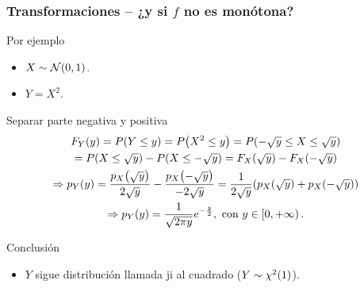 \documentclass[table]{beamer}
\begin{document}
\begin{frame}
    \frametitle{Transformaciones -- ¿y si $f$ no es monótona?}
    \begin{exampleblock}{Por ejemplo}
        \begin{itemize}
            \item $X \sim \normal{0}{1}$.
            \item $Y = X^{2}$.
        \end{itemize}
    \end{exampleblock}
    \begin{block}{Separar parte negativa y positiva}
        \begin{multline*}
            \pFF{Y}{y} = \prob{Y \leq y} = \prob{X^{2} \leq y}
            = \prob{- \sqrt{y} \leq X \leq \sqrt{y}}
            \\
            = \prob{X \leq \sqrt{y}} - \prob{X \leq - \sqrt{y}}
            = \pFF{X}{\sqrt{y}} - \pFF{X}{- \sqrt{y}}
            \\
            \Rightarrow
            \ppdf{Y}{y} =
            \frac{\ppdf{X}{\sqrt{y}}}{2 \sqrt{y}} - \frac{\ppdf{X}{- \sqrt{y}}}{- 2 \sqrt{y}}
            = \frac{1}{2 \sqrt{y}} \parens{\ppdf{X}{\sqrt{y}} + \ppdf{X}{- \sqrt{y}}}
            \\
            \Rightarrow
            \ppdf{Y}{y}
            = \frac{1}{\sqrt{2 \pi y}} e^{-\frac{y}{2}} ,
            \text{ con } y \in \left [ 0 , + \infty \right ) .
        \end{multline*}
    \end{block}
    \begin{block}{Conclusión}
        \begin{itemize}
            \item $Y$ sigue distribución llamada ji al cuadrado ($Y \sim \chidist{1}$).
        \end{itemize}
    \end{block}
\end{frame}
\end{document}
